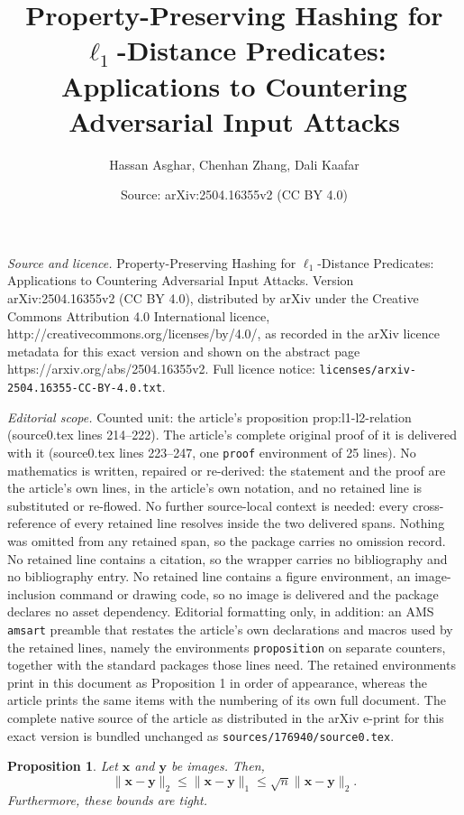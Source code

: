 \documentclass[10pt,a4paper]{amsart}
\title{Property-Preserving Hashing for \texorpdfstring{$\ell_1$}{l1}-Distance Predicates: Applications to Countering Adversarial Input Attacks}
\author{Hassan Asghar, Chenhan Zhang, Dali Kaafar}
\date{Source: arXiv:2504.16355v2 (CC BY 4.0)}
\newtheorem{proposition}{Proposition}
\newcommand{\norm}[1]{\lVert{#1}\rVert}
\newcommand{\vtr}[1]{\mathbf{#1}}
\begin{document}
\maketitle

\noindent\emph{Source and licence.} Property-Preserving Hashing for \texorpdfstring{$\ell_1$}{l1}-Distance Predicates: Applications to Countering Adversarial Input Attacks. Version arXiv:2504.16355v2 (CC BY 4.0), distributed by arXiv under the Creative Commons Attribution 4.0 International licence, http://creativecommons.org/licenses/by/4.0/, as recorded in the arXiv licence metadata for this exact version and shown on the abstract page https://arxiv.org/abs/2504.16355v2. Full licence notice: \texttt{licenses/arxiv-2504.16355-CC-BY-4.0.txt}.\par\smallskip

\noindent\textit{Editorial scope.} Counted unit: the article's proposition prop:l1-l2-relation (source0.tex lines 214--222). The article's complete original proof of it is delivered with it (source0.tex lines 223--247, one \texttt{proof} environment of 25 lines). No mathematics is written, repaired or re-derived: the statement and the proof are the article's own lines, in the article's own notation, and no retained line is substituted or re-flowed.  No further source-local context is needed: every cross-reference of every retained line resolves inside the two delivered spans.  Nothing was omitted from any retained span, so the package carries no omission record.  No retained line contains a citation, so the wrapper carries no bibliography and no bibliography entry.  No retained line contains a figure environment, an image-inclusion command or drawing code, so no image is delivered and the package declares no asset dependency.  Editorial formatting only, in addition: an AMS \texttt{amsart} preamble that restates the article's own declarations and macros used by the retained lines, namely the environments \texttt{proposition} on separate counters, together with the standard packages those lines need.  The retained environments print in this document as Proposition 1 in order of appearance, whereas the article prints the same items with the numbering of its own full document.  The complete native source of the article as distributed in the arXiv e-print for this exact version is bundled unchanged as \texttt{sources/176940/source0.tex}.
\begin{proposition}
\label{prop:l1-l2-relation}
Let $\vtr{x}$ and $\vtr{y}$ be images. Then,
\begin{equation}
\label{eq:l1-l2-relation}
 \norm{\vtr{x} - \vtr{y}}_2 \leq \norm{\vtr{x} - \vtr{y}}_1 \leq \sqrt{n}\norm{\vtr{x} - \vtr{y}}_2.   
\end{equation}
Furthermore, these bounds are tight. 
\end{proposition}
\end{document}
